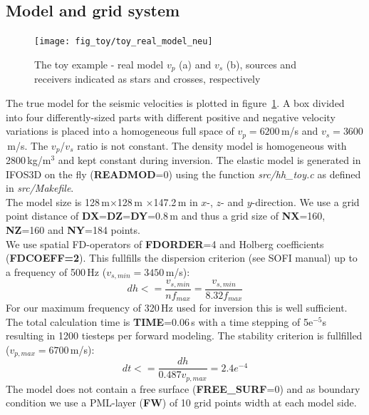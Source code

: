 \subsection{Model and grid system}
\begin{figure}[h!]
\begin{center}
\texttt{[image: fig\_toy/toy\_real\_model\_neu]}
\caption[Toy example - the real model and acquisition geometry]{The toy example - real model $v_p$ (a) and $v_s$ (b), sources and receivers indicated as stars and crosses, respectively}\label{fig:toy_model}
\end{center}
\end{figure}
The true model for the seismic velocities is plotted in figure~\ref{fig:toy_model}. A box divided into four differently-sized parts with different positive and negative velocity variations is placed into a homogeneous full space of $v_p=6200$\,m/s and $v_s=3600$\,m/s. The $v_p$/$v_s$ ratio is not constant.
The density model is homogeneous with 2800\,kg/m$^3$ and kept constant during inversion. The elastic model is generated in IFOS3D on the fly (\textbf{READMOD}=0) using the function \textit{src/hh\_toy.c} as defined in \textit{src/Makefile}.\\
The model size is 128\,m$\times$128\,m $\times$147.2\,m in $x$-, $z$- and $y$-direction. We use a grid point distance of \textbf{DX}=\textbf{DZ}=\textbf{DY}=0.8\,m and thus a grid size of \textbf{NX}=160, \textbf{NZ}=160 and \textbf{NY}=184 points. \\
We use spatial FD-operators of \textbf{FDORDER}=4 and Holberg coefficients (\textbf{FDCOEFF=2}). This fullfills the dispersion criterion (see SOFI manual) up to a frequency of 500\,Hz ($v_{s,min}=3450$\,m/s):
\begin{equation}
 dh <= \frac{v_{s,min}}{nf_{max}}=\frac{v_{s,min}}{8.32f_{max}}
\end{equation}
For our maximum frequency of 320\,Hz used for inversion this is well sufficient. \\
The total calculation time is \textbf{TIME}=0.06\,s with a time stepping of 5e$^{-5}$s resulting in 1200 tiesteps per forward modeling. The stability criterion is fullfilled ($v_{p,max}=6700$\,m/s):
\begin{equation}
 dt<=\frac{dh}{0.487v_{p,max}}=2.4e^{-4}
\end{equation}
The model does not contain a free surface (\textbf{FREE\_SURF}=0) and as boundary condition we use a PML-layer (\textbf{FW}) of 10 grid points width at each model side.\\

